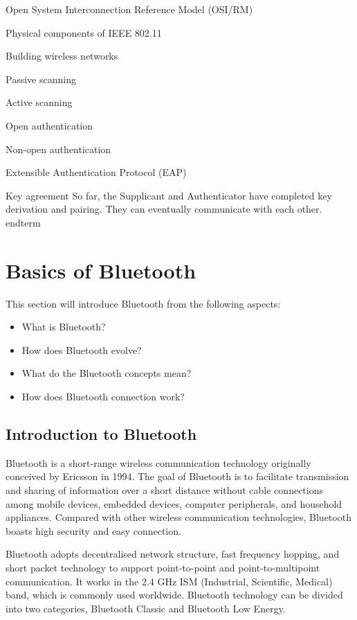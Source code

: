 \documentclass[a4paper,12pt]{book}
\begin{document}
\begin{term}{Open System Interconnection Reference Model (OSI/RM)}
\begin{term}{Physical components of IEEE 802.11}
\begin{term}{Building wireless networks}
\begin{term}{Passive scanning}
\begin{term}{Active scanning}
\begin{term}{Open authentication}
\begin{term}{Non-open authentication}
\begin{term}{Extensible Authentication Protocol (EAP)}
\begin{term}{Key agreement}
    So far, the Supplicant and Authenticator have completed key derivation and pairing. They can eventually communicate with each other.
\\end{term}{}

\section{Basics of Bluetooth}
This section will introduce Bluetooth from the following aspects:

\begin{itemize}
    \item What is Bluetooth?
    \item How does Bluetooth evolve?
    \item What do the Bluetooth concepts mean?
    \item How does Bluetooth connection work?
\end{itemize}

\subsection{Introduction to Bluetooth}
Bluetooth is a short-range wireless communication technology originally conceived by Ericsson in 1994. The goal of Bluetooth is to facilitate transmission and sharing of information over a short distance without cable connections among mobile devices, embedded devices, computer peripherals, and household appliances. Compared with other wireless communication technologies, Bluetooth boasts high security and easy connection.


Bluetooth adopts decentralised network structure, fast frequency hopping, and short packet technology to support point-to-point and point-to-multipoint communication. It works in the 2.4 GHz ISM (Industrial, Scientific, Medical) band, which is commonly used worldwide. Bluetooth technology can be divided into two categories, Bluetooth Classic and Bluetooth Low Energy.


\end{term}
\end{term}
\end{term}
\end{term}
\end{term}
\end{term}
\end{term}
\end{term}
\end{term}
\end{document}
